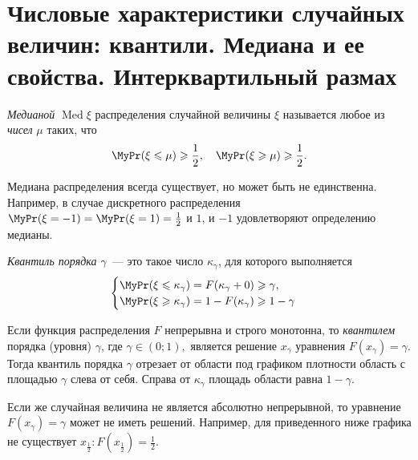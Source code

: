 \section {Числовые характеристики случайных величин: квантили. Медиана и ее свойства. Интерквартильный размах}

\begin{defn}
    \textit{Медианой} $\operatorname{Med} \xi$ распределения случайной величины $\xi$ называется любое из \textit{чисел} $\mu$ таких, что
    \begin{equation*}
        \MyPr(\xi \leqslant \mu) \geqslant \frac{1}{2}, ~~~ \MyPr(\xi \geqslant \mu) \geqslant \frac{1}{2}.
    \end{equation*}
\end{defn} 

\begin{rmrk}
    Медиана распределения всегда существует, но может быть не единственна. 
    Например, в случае дискретного распределения $\MyPr(\xi = -1) = \MyPr(\xi = 1) = \frac{1}{2}$ и $1$, и $-1$ удовлетворяют определению медианы.
\end{rmrk} 

\begin{defn}
\textit{Квантиль порядка $\gamma$}~--- это такое число $\kappa_\gamma$, для которого выполняется
\begin{equation*}
    \begin{cases} 
        \MyPr(\xi \leqslant \kappa_\gamma) = F(\kappa_\gamma + 0) \geqslant \gamma, \\
        \MyPr(\xi \geqslant \kappa_\gamma) = 1 - F(\kappa_\gamma) \geqslant 1 - \gamma 
    \end{cases}
\end{equation*}
\end{defn}

\begin{rmrk}
    Если функция распределения $F$ непрерывна и строго монотонна, то \textit{квантилем} порядка (уровня) $\gamma$, где $\gamma \in (0; 1), $ является решение $x_\gamma$ уравнения $F(x_\gamma) = \gamma.$ 
    Тогда квантиль порядка $\gamma$ отрезает от области под графиком плотности область с площадью $\gamma$ слева от себя. Справа от $\kappa_\gamma$ площадь области равна $1 - \gamma$.
    
    Если же случайная величина не является абсолютно непрерывной, то уравнение $F(x_\gamma) = \gamma$ может не иметь решений. Например, для приведенного ниже графика не существует $x_{\frac{1}{2}}: F(x_{\frac{1}{2}}) = \frac{1}{2}$.
    
\end{rmrk} 

